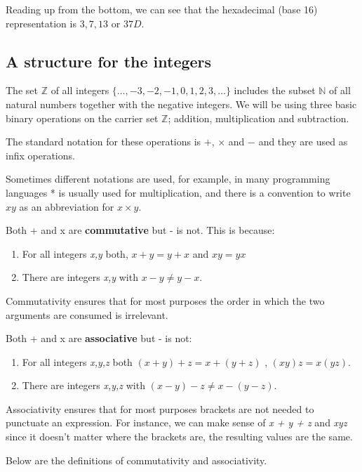 Reading up from the bottom, we can see that the hexadecimal (base 16)
representation is $3,7,13$ or $37D$.

\subsection{A structure for the integers}

The set $\mathbb{Z}$ of all integers $\{\ldots,-3,-2,-1,0,1,2,3,\ldots\}$
includes the subset $\mathbb{N}$ of all natural numbers together with the
negative integers. We will be using three basic binary operations on the
carrier set $\mathbb{Z}$; addition, multiplication and subtraction.

The standard notation for these operations is $+$, $\times$ and $-$ and they are
used as infix operations.

Sometimes different notations are used, for example, in many programming
languages * is usually used for multiplication, and there is a convention to
write $xy$ as an abbreviation for $x \times y$.
 
Both + and x are {\bf commutative} but - is not. This is because:

\begin{enumerate}
	\item For all integers {\it x,y} both, $x + y = y + x$ and $xy = yx$
	\item There are integers {\it x,y} with $x - y \ne y - x$.
\end{enumerate}

Commutativity ensures that for most purposes the order in which the two
arguments are consumed is irrelevant.

Both + and x are {\bf associative} but - is not:

\begin{enumerate}
	\item For all integers {\it x,y,z} both $(x + y) + z = x + (y + z)$ , $(xy)z = x(yz)$.
	\item There are integers {\it x,y,z} with $(x - y) - z \ne x - (y - z)$.
\end{enumerate}

Associativity ensures that for most purposes brackets are not needed to
punctuate an expression. For instance, we can make sense of {\it x + y + z} and
{\it xyz} since it doesn't matter where the brackets are, the resulting values
are the same.

Below are the definitions of commutativity and associativity.

